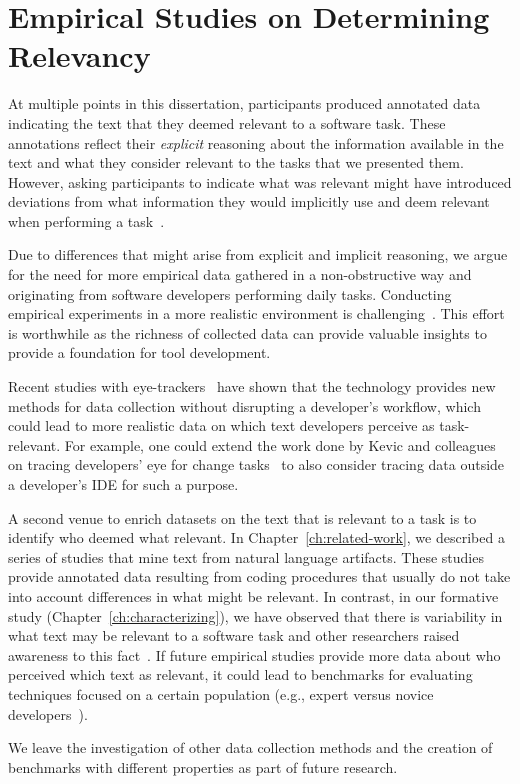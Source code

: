 






\section{Empirical Studies on Determining Relevancy}
\label{cp7:empirical-studies}




At multiple points in this dissertation, participants produced annotated data 
indicating the text that they deemed relevant to a software task. 
These annotations reflect their \textit{explicit} reasoning about the information 
available in the text and what they consider relevant to the tasks 
that we presented them. However, 
asking participants to indicate what was relevant might have 
introduced deviations from what information
they would implicitly use and deem relevant 
when performing a task~\cite{Lazar2017}.




Due to differences that might arise from explicit and implicit reasoning,
 we argue for the need for more empirical data gathered in a non-obstructive way
and originating from software developers performing daily tasks.
Conducting empirical
 experiments in a more realistic environment is challenging~\cite{Kevic2015}.
This effort is worthwhile as
the richness of collected data can provide valuable insights
to provide a foundation for tool development.

Recent studies with eye-trackers~\cite{Cutrell2007, Petrusel2013, sharafi2020}
have shown that the technology provides new
methods for
data collection without disrupting a developer's workflow,
which could lead to more realistic data on which text developers perceive as task-relevant.
For example, one could
extend the work done by Kevic and colleagues on
tracing developers' eye for change tasks~\cite{Kevic2015} to
also consider tracing data outside a developer's IDE
for such a purpose.




A second venue to enrich datasets on the text that is relevant to a task 
is to identify who deemed what relevant. 
In Chapter~\ref{ch:related-work}, we described 
a series of studies that mine text from natural language artifacts.
These studies provide annotated data 
resulting from coding procedures that usually do not take into account
differences in what might be relevant. 
In contrast, in our formative study (Chapter~\ref{ch:characterizing}),
we have observed that there is variability in what text may be relevant 
to a software task and other researchers raised awareness to this fact~\cite{Bavota2016,Robillard2015}.
If future empirical studies
provide more data about who perceived which text as relevant, it could lead to benchmarks 
for evaluating techniques
focused on a certain population  (e.g., expert versus novice developers~\cite{Crosby1990, Busjahn2015}). 





We leave the investigation of other data collection methods 
and the creation of benchmarks with different properties
as part of future research.





